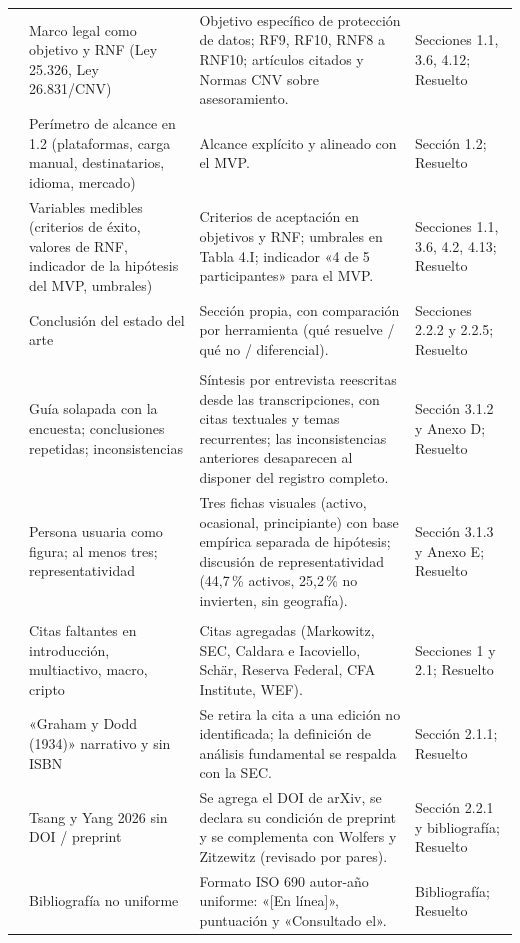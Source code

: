 \documentclass[a4paper,11pt]{article}
\newcommand{\ok}{\textcolor{green!45!black}{Resuelto}}
\begin{document}
\begin{longtable}{>{\raggedright\arraybackslash}p{0.6cm}>{\raggedright\arraybackslash}p{5.2cm}>{\raggedright\arraybackslash}p{7.3cm}>{\raggedright\arraybackslash}p{3.4cm}}
39 & Marco legal como objetivo y RNF (Ley 25.326, Ley 26.831/CNV) & Objetivo específico de protección de datos; RF9, RF10, RNF8 a RNF10; artículos citados y Normas CNV sobre asesoramiento. & Secciones 1.1, 3.6, 4.12; \ok\\
40 & Perímetro de alcance en 1.2 (plataformas, carga manual, destinatarios, idioma, mercado) & Alcance explícito y alineado con el MVP. & Sección 1.2; \ok\\
41 & Variables medibles (criterios de éxito, valores de RNF, indicador de la hipótesis del MVP, umbrales) & Criterios de aceptación en objetivos y RNF; umbrales en Tabla 4.I; indicador «4 de 5 participantes» para el MVP. & Secciones 1.1, 3.6, 4.2, 4.13; \ok\\
42 & Conclusión del estado del arte & Sección propia, con comparación por herramienta (qué resuelve / qué no / diferencial). & Secciones 2.2.2 y 2.2.5; \ok\\
\multicolumn{4}{l}{\textit{Entrevistas y personas}}\\
43 & Guía solapada con la encuesta; conclusiones repetidas; inconsistencias & Síntesis por entrevista reescritas desde las transcripciones, con citas textuales y temas recurrentes; las inconsistencias anteriores desaparecen al disponer del registro completo. & Sección 3.1.2 y Anexo D; \ok\\
44 & Persona usuaria como figura; al menos tres; representatividad & Tres fichas visuales (activo, ocasional, principiante) con base empírica separada de hipótesis; discusión de representatividad (44,7\,\% activos, 25,2\,\% no invierten, sin geografía). & Sección 3.1.3 y Anexo E; \ok\\
\multicolumn{4}{l}{\textit{Fuentes}}\\
45 & Citas faltantes en introducción, multiactivo, macro, cripto & Citas agregadas (Markowitz, SEC, Caldara e Iacoviello, Schär, Reserva Federal, CFA Institute, WEF). & Secciones 1 y 2.1; \ok\\
46 & «Graham y Dodd (1934)» narrativo y sin ISBN & Se retira la cita a una edición no identificada; la definición de análisis fundamental se respalda con la SEC. & Sección 2.1.1; \ok\\
47 & Tsang y Yang 2026 sin DOI / preprint & Se agrega el DOI de arXiv, se declara su condición de preprint y se complementa con Wolfers y Zitzewitz (revisado por pares). & Sección 2.2.1 y bibliografía; \ok\\
48 & Bibliografía no uniforme & Formato ISO 690 autor-año uniforme: «[En línea]», puntuación y «Consultado el». & Bibliografía; \ok\\

\end{longtable}
\end{document}
